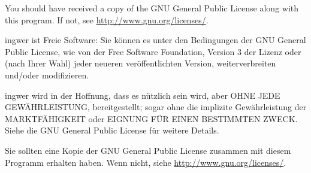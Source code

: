 \documentclass[11pt]{scrartcl} %
\begin{document}
You should have received a copy of the GNU General Public License
along with this program.  If not, see \url{http://www.gnu.org/licenses/}.

ingwer ist Freie Software: Sie können es unter den Bedingungen
der GNU General Public License, wie von der Free Software Foundation,
Version 3 der Lizenz oder (nach Ihrer Wahl) jeder neueren
veröffentlichten Version, weiterverbreiten und/oder modifizieren.

ingwer wird in der Hoffnung, dass es nützlich sein wird, aber
OHNE JEDE GEWÄHRLEISTUNG, bereitgestellt; sogar ohne die implizite
Gewährleistung der MARKTFÄHIGKEIT oder EIGNUNG FÜR EINEN BESTIMMTEN ZWECK.
Siehe die GNU General Public License für weitere Details.

Sie sollten eine Kopie der GNU General Public License zusammen mit diesem
Programm erhalten haben. Wenn nicht, siehe \url{http://www.gnu.org/licenses/}.
\end{document}
